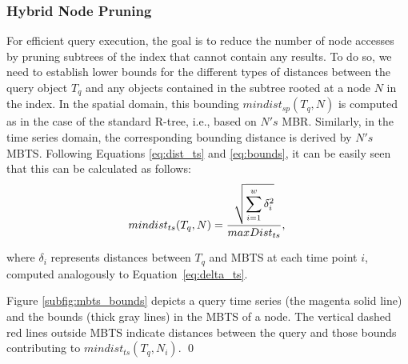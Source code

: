 

\subsubsection{Hybrid Node Pruning}
\label{subsec:index_pruning}

For efficient query execution, the goal is to reduce the number of node accesses by pruning subtrees of the index that cannot contain any results. To do so, we need to establish lower bounds for the different types of distances between the query object $T_q$ and any objects contained in the subtree rooted at a node $N$ in the index. In the spatial domain, this bounding $mindist_{sp}(T_q, N)$ is computed as in the case of the standard R-tree, i.e., based on $N's$ MBR. Similarly, in the time series domain, the corresponding bounding distance is derived by $N's$ MBTS. Following Equations \ref{eq:dist_ts} and \ref{eq:bounds}, it can be easily seen that this can be calculated as follows:
\begin{equation}
 mindist_{ts}(T_q, N) = \frac{\displaystyle \sqrt{\sum_{i=1}^{w} \delta_i^2}}{maxDist_{ts}}, \\
\label{eq:mindist_ts}
\end{equation}

\noindent where $\delta_i$ represents distances between $T_q$ and MBTS at each time point $i$, computed analogously to Equation~\ref{eq:delta_ts}.



\begin{myexample}
  Figure \ref{subfig:mbts_bounds} depicts a query time series (the magenta solid line) and the bounds (thick gray lines) in the MBTS of a node. The vertical dashed red lines outside MBTS indicate distances between the query and those bounds contributing to $mindist_{ts}(T_q, N_i)$.   \qed 
\end{myexample}


